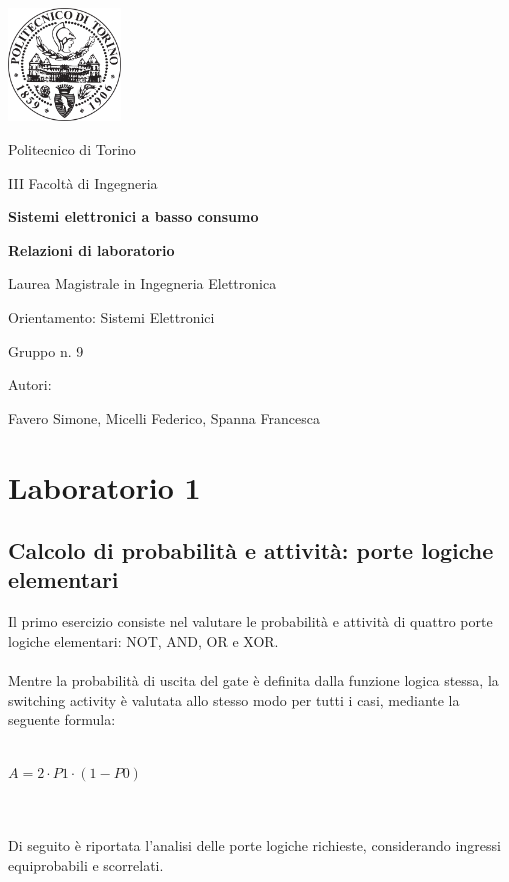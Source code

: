 \documentclass[11pt,  english, makeidx, a4paper, titlepage, oneside]{book}
\begin{document}
\begin{titlepage}

	\centerline{\includegraphics[width=3cm]{./img/general/polito.png}}
	\vspace{0.3cm}
	\centerline{\Large{Politecnico di Torino}}
	\vspace{0.3cm}
	\centerline{\Large{III Facoltà di Ingegneria}}
	\vspace{3cm}
	\centerline{\Huge\textbf{Sistemi elettronici a basso consumo}}
	\vspace{1cm}
	\centerline{\LARGE\textbf{Relazioni di laboratorio}}
	\vspace{3cm}
	\centerline{\LARGE{Laurea Magistrale in Ingegneria Elettronica}}
	\vspace{0.3cm}
	\centerline{\LARGE{Orientamento: Sistemi Elettronici}}
	\vspace{3cm}
	\centerline{\Large{Gruppo n. 9}}
	\vspace{2cm}
	\centerline{\Large{Autori:}}
	\vspace{0.3cm}
	\centerline{\Large{Favero Simone, Micelli Federico, Spanna Francesca}}
	
\end{titlepage}

\tableofcontents %
\pagebreak %

\chapter{Laboratorio 1}


\section{Calcolo di probabilità e attività: porte logiche elementari}

Il primo esercizio consiste nel valutare le probabilità e attività di 
quattro porte logiche elementari: NOT, AND, OR e XOR.
\\\\
Mentre la probabilità di uscita del gate è definita dalla funzione logica
stessa, la switching activity è valutata allo stesso modo per tutti i casi, 
mediante la seguente formula:
\\\\
	\centerline{$A = 2 \cdot P1 \cdot (1-P0)$}
\\\\
Di seguito è riportata l'analisi delle porte logiche richieste, considerando 
ingressi equiprobabili e scorrelati.
\end{document}
